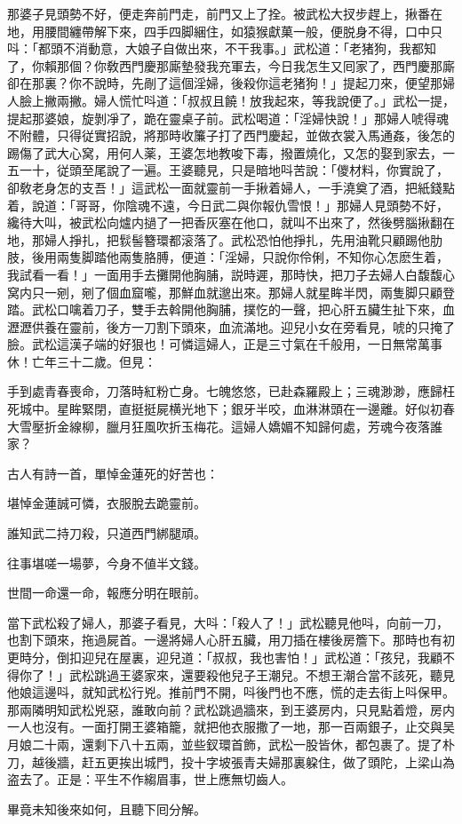那婆子見頭勢不好，便走奔前門走，前門又上了拴。被武松大扠步趕上，揪番在地，用腰間纏帶解下來，四手四脚綑住，如猿猴獻菓一般，便脱身不得，口中只呌：「都頭不消動意，大娘子自做出來，不干我事。」武松道：「老猪狗，我都知了，你賴那個？你敎西門慶那廝墊發我充軍去，今日我怎生又囘家了，西門慶那廝卻在那裏？你不說時，先剮了這個淫婦，後殺你這老猪狗！」提起刀來，便望那婦人臉上撇兩撇。婦人慌忙呌道：「叔叔且饒！放我起來，等我說便了。」武松一提，提起那婆娘，旋剝凈了，跪在靈桌子前。武松喝道：「淫婦快說！」那婦人唬得魂不附體，只得従實招說，將那時收簾子打了西門慶起，並做衣裳入馬通姦，後怎的踢傷了武大心窝，用何人薬，王婆怎地教唆下毒，撥置燒化，又怎的娶到家去，一五一十，従頭至尾說了一遍。王婆聽見，只是暗地呌苦說：「儍材料，你實說了，卻敎老身怎的支吾！」這武松一面就靈前一手揪着婦人，一手澆奠了酒，把紙錢點着，說道：「哥哥，你陰魂不遠，今日武二與你報仇雪恨！」那婦人見頭勢不好，纔待大叫，被武松向爐内撾了一把香灰塞在他口，就叫不出來了，然後劈腦揪翻在地，那婦人掙扎，把䯼髻簪環都滚落了。武松恐怕他掙扎，先用油靴只顧踢他肋肢，後用兩隻脚踏他兩隻胳膊，便道：「淫婦，只說你伶俐，不知你心怎麽生着，我試看一看！」一面用手去攤開他胸脯，説時遲，那時快，把刀子去婦人白馥馥心窝内只一剜，剜了個血窟嚨，那鮮血就邈出來。那婦人就星眸半閃，兩隻脚只顧登踏。武松口噙着刀子，雙手去斡開他胸脯，撲忔的一聲，把心肝五臟生扯下來，血瀝瀝供養在靈前，後方一刀割下頭來，血流滿地。迎兒小女在旁看見，唬的只掩了臉。武松這漢子端的好狠也！可憐這婦人，正是三寸氣在千般用，一日無常萬事休！亡年三十二歲。但見：

\begin{myquote}
手到處青春喪命，刀落時紅粉亡身。七魄悠悠，已赴森羅殿上；三魂渺渺，應歸枉死城中。星眸緊閉，直挺挺屍横光地下；銀牙半咬，血淋淋頭在一邊離。好似初春大雪壓折金線柳，臘月狂風吹折玉梅花。這婦人嬌媚不知歸何處，芳魂今夜落誰家？
\end{myquote}

古人有詩一首，單悼金蓮死的好苦也：

\begin{myquote}
堪悼金蓮誠可憐，衣服脫去跪靈前。

誰知武二持刀殺，只道西門綁腿頑。

往事堪嗟一場夢，今身不値半文錢。

世間一命還一命，報應分明在眼前。
\end{myquote}

當下武松殺了婦人，那婆子看見，大呌：「殺人了！」武松聽見他呌，向前一刀，也割下頭來，拖過屍首。一邊將婦人心肝五臟，用刀插在樓後房簷下。那時也有初更時分，倒扣迎兒在屋裏，迎兒道：「叔叔，我也害怕！」武松道：「孩兒，我顧不得你了！」武松跳過王婆家來，還要殺他兒子王潮兒。不想王潮合當不該死，聽見他娘這邊呌，就知武松行兇。推前門不開，呌後門也不應，慌的走去街上呌保甲。那兩隣明知武松兇惡，誰敢向前？武松跳過牆來，到王婆房内，只見點着燈，房内一人也沒有。一面打開王婆箱籠，就把他衣服撒了一地，那一百兩銀子，止交與吴月娘二十兩，還剩下八十五兩，並些釵環首飾，武松一股皆休，都包裹了。提了朴刀，越後牆，赶五更挨出城門，投十字坡張青夫婦那裏躱住，做了頭陀，上梁山為盗去了。正是：平生不作縐眉事，世上應無切齒人。

畢竟未知後來如何，且聽下囘分解。

